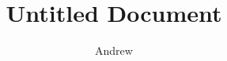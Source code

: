 \documentclass[a4paper]{article}
\title{Untitled Document}
\author{Andrew}
\begin{document}
\maketitle


\tableofcontents

\section{}
\end{document}
